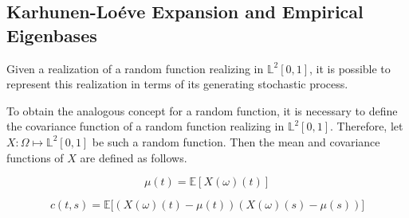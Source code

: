 \documentclass[11pt,twoside,a4paper]{article}
\begin{document}
	\subsection{Karhunen-Lo\'{e}ve Expansion and Empirical Eigenbases}\hypertarget{KL}{}
	Given a realization of a random function realizing in $\mathbb{L}^2[0,1]$, it is possible to represent this realization in terms of its generating stochastic process. 
	
	
	
	
	To obtain the analogous concept for a random function, it is necessary to define the covariance function of a random function realizing in $\mathbb{L}^2[0,1]$. Therefore, let $X: \Omega \mapsto \mathbb{L}^2[0,1]$ be such a random function.
	Then the mean and covariance functions of $X$ are defined as follows.
	
	\begin{equation}\label{MeanFunction}
		\mu(t) = \mathbb{E}\left[ X(\omega)(t) \right]
	\end{equation}
	
	\begin{equation}\label{CovarianceFunction}
		c(t,s) = \mathbb{E}\big[ \left( X(\omega)(t) - \mu(t) \right) \left( X(\omega)(s) - \mu(s) \right) \big]
	\end{equation}
	
\end{document}
